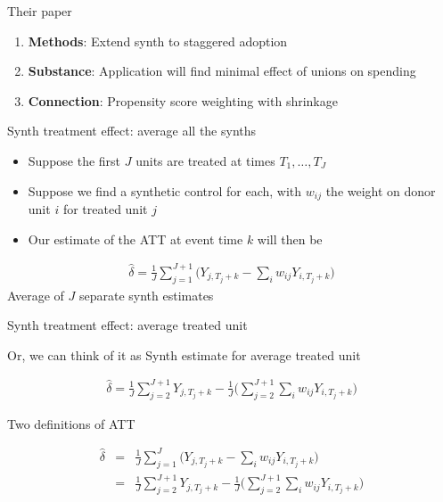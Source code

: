 \documentclass{beamer}
\begin{document}

\begin{frame}{Their paper}

\begin{enumerate}
\item \textbf{Methods}: Extend synth to staggered adoption
\item \textbf{Substance}: Application will find minimal effect of unions on spending
\item \textbf{Connection}: Propensity score weighting with shrinkage
\end{enumerate}

\end{frame}




\begin{frame}{Synth treatment effect: average all the synths}

\begin{itemize}
\item Suppose the first $J$ units are treated at times $T_1, \dots, T_J$
\item Suppose we find a synthetic control for each, with $w_{ij}$ the weight on donor unit $i$ for treated unit $j$
\item Our estimate of the ATT at event time $k$ will then be
\end{itemize}

\begin{eqnarray*}
\widehat{\delta} = \frac{1}{J} \sum_{j=1}^{J+1} \bigg ( Y_{j,T_j+k} - \sum_i w_{ij} Y_{i,T_j+k} \bigg )
\end{eqnarray*}Average of $J$ separate synth estimates

\end{frame}


\begin{frame}{Synth treatment effect: average treated unit}

Or, we can think of it as Synth estimate for average treated unit

\begin{eqnarray*}
\widehat{\delta} = \frac{1}{J} \sum_{j=2}^{J+1} Y_{j,T_j+k} - \frac{1}{J} \bigg ( \sum_{j=2}^{J+1} \sum_i w_{ij} Y_{i,T_j+k} \bigg )
\end{eqnarray*}

\end{frame}


\begin{frame}{Two definitions of ATT}


\begin{eqnarray*}
\widehat{\delta} &=& \frac{1}{J} \sum_{j=1}^J \bigg ( Y_{j,T_j+k} - \sum_i w_{ij} Y_{i,T_j+k} \bigg ) \\
&=& \frac{1}{J} \sum_{j=2}^{J+1} Y_{j,T_j+k} - \frac{1}{J} \bigg ( \sum_{j=2}^{J+1} \sum_i w_{ij} Y_{i,T_j+k} \bigg )
\end{eqnarray*}

\end{frame}
\end{document}

